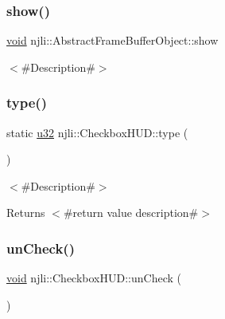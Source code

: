 \mbox{\label{classnjli_1_1_checkbox_h_u_d_a73ffd499fceaacd59b518a541ed2133e}} 
\subsubsection{\texorpdfstring{show()}{show()}}
{\footnotesize\ttfamily \mbox{\hyperlink{_thread_8h_af1e856da2e658414cb2456cb6f7ebc66}{void}} njli\+::\+Abstract\+Frame\+Buffer\+Object\+::show}

$<$\#\+Description\#$>$ \mbox{\label{classnjli_1_1_checkbox_h_u_d_a92edaeae8e24b4f07814e20d4fbff290}} 
\subsubsection{\texorpdfstring{type()}{type()}}
{\footnotesize\ttfamily static \mbox{\hyperlink{_util_8h_a10e94b422ef0c20dcdec20d31a1f5049}{u32}} njli\+::\+Checkbox\+H\+U\+D\+::type (\begin{DoxyParamCaption}{ }\end{DoxyParamCaption})\hspace{0.3cm}{\ttfamily [static]}}

$<$\#\+Description\#$>$

\begin{DoxyReturn}{Returns}
$<$\#return value description\#$>$ 
\end{DoxyReturn}
\mbox{\label{classnjli_1_1_checkbox_h_u_d_a6e4733ecf2b4e5e44cd8206af9bdc671}} 
\subsubsection{\texorpdfstring{un\+Check()}{unCheck()}}
{\footnotesize\ttfamily \mbox{\hyperlink{_thread_8h_af1e856da2e658414cb2456cb6f7ebc66}{void}} njli\+::\+Checkbox\+H\+U\+D\+::un\+Check (\begin{DoxyParamCaption}{ }\end{DoxyParamCaption})}



